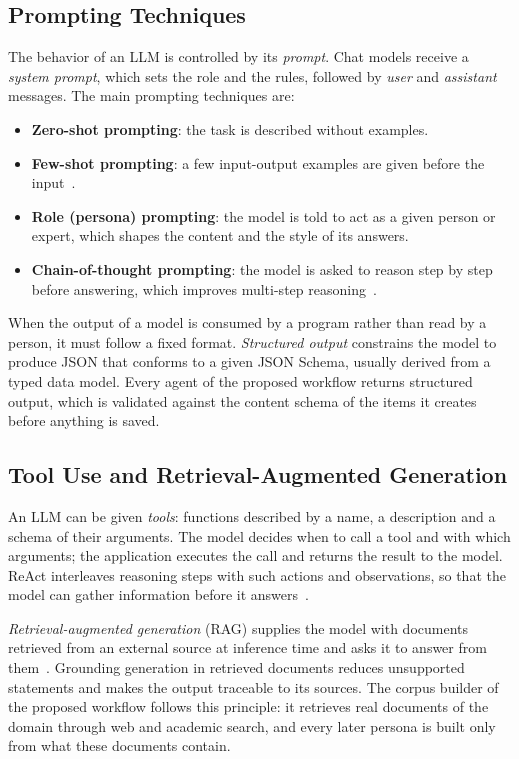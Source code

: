 \subsection{Prompting Techniques}
\label{sec:bg-prompting}

The behavior of an LLM is controlled by its \emph{prompt}. Chat models receive a \emph{system prompt}, which sets the role and the rules, followed by \emph{user} and \emph{assistant} messages. The main prompting techniques are:
\begin{itemize}
    \item \textbf{Zero-shot prompting}: the task is described without examples.
    \item \textbf{Few-shot prompting}: a few input-output examples are given before the input~\cite{brown2020language}.
    \item \textbf{Role (persona) prompting}: the model is told to act as a given person or expert, which shapes the content and the style of its answers.
    \item \textbf{Chain-of-thought prompting}: the model is asked to reason step by step before answering, which improves multi-step reasoning~\cite{wei2022chain}.
\end{itemize}

When the output of a model is consumed by a program rather than read by a person, it must follow a fixed format. \emph{Structured output} constrains the model to produce JSON that conforms to a given JSON Schema, usually derived from a typed data model. Every agent of the proposed workflow returns structured output, which is validated against the content schema of the items it creates before anything is saved.

\subsection{Tool Use and Retrieval-Augmented Generation}
\label{sec:bg-tools-rag}

An LLM can be given \emph{tools}: functions described by a name, a description and a schema of their arguments. The model decides when to call a tool and with which arguments; the application executes the call and returns the result to the model. ReAct interleaves reasoning steps with such actions and observations, so that the model can gather information before it answers~\cite{yao2023react}.

\emph{Retrieval-augmented generation} (RAG) supplies the model with documents retrieved from an external source at inference time and asks it to answer from them~\cite{lewis2020retrieval}. Grounding generation in retrieved documents reduces unsupported statements and makes the output traceable to its sources. The corpus builder of the proposed workflow follows this principle: it retrieves real documents of the domain through web and academic search, and every later persona is built only from what these documents contain.

